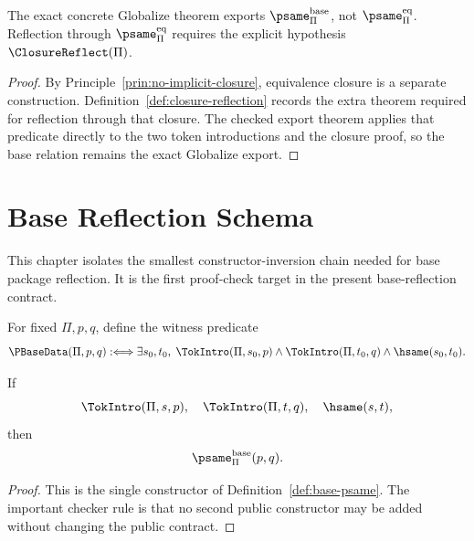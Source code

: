 \begin{corollary}
\label{cor:eq-not-exported}
The exact concrete Globalize theorem exports \(\psame_{\Pi}^{\mathrm{base}}\), not \(\psame_{\Pi}^{\mathrm{eq}}\). Reflection through \(\psame_{\Pi}^{\mathrm{eq}}\) requires the explicit hypothesis \(\ClosureReflect(\Pi)\).
\end{corollary}

\begin{proof}
By Principle~\ref{prin:no-implicit-closure}, equivalence closure is a separate construction. Definition~\ref{def:closure-reflection} records the extra theorem required for reflection through that closure. The checked export theorem applies that predicate directly to the two token introductions and the closure proof, so the base relation remains the exact Globalize export.
\end{proof}

\section{Base Reflection Schema}
\label{sec:po-base-reflection-schema}

This chapter isolates the smallest constructor-inversion chain needed for base package reflection. It is the first proof-check target in the present base-reflection contract.

\begin{definition}
\label{def:psame-base-data}
For fixed \(\Pi,p,q\), define the witness predicate
$$
\PBaseData(\Pi,p,q) :\Longleftrightarrow
\exists s_0,t_0,\;\TokIntro(\Pi,s_0,p)\wedge\TokIntro(\Pi,t_0,q)\wedge\hsame(s_0,t_0).
$$
\end{definition}

\begin{lemma}
\label{lem:psame-base-constructor}
If
$$
  \TokIntro(\Pi,s,p),\quad \TokIntro(\Pi,t,q),\quad \hsame(s,t),
$$
then
$$
  \psame_{\Pi}^{\mathrm{base}}(p,q).
$$
\end{lemma}

\begin{proof}
This is the single constructor of Definition~\ref{def:base-psame}. The important checker rule is that no second public constructor may be added without changing the public contract.
\end{proof}

